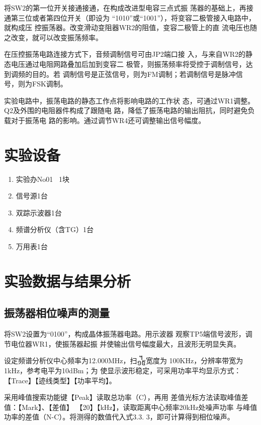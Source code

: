 \documentclass{../source/Experiment}
\begin{document}
将SW2的第一位开关接通接通，在构成改进型电容三点式振
荡器的基础上，再接通第三位或者第四位开关（即设为
“1010”或“1001”），将变容二极管接入电路中，就构成压
控振荡器。改变滑动变阻器WR2的阻值，变容二极管上的直
流电压也随之改变，就可以改变振荡频率。

在压控振荡电路连接方式下，音频调制信号可由JP2端口接
入，与来自WR2的静态电压通过电阻网路叠加后加到变容二
极管，则振荡频率将受控于调制信号，达到调频的目的。若
调制信号是正弦信号，则为FM调制；若调制信号是脉冲信
号，则为FSK调制。

实验电路中，振荡电路的静态工作点将影响电路的工作状
态，可通过WR1调整。Q2及外围的电阻器件构成了跟随电
路，降低了振荡电路的输出阻抗，同时避免负载对于振荡电
路的影响。通过调节WR4还可调整输出信号幅度。


\section{实验设备}
\begin{enumerate}
    \item 实验办No01 \, 1块
    \item 信号源1台
    \item 双踪示波器1台
    \item 频谱分析仪（含TG）1台
    \item 万用表1台
\end{enumerate}

\section{实验数据与结果分析}
\subsection{振荡器相位噪声的测量}

将SW2设置为“0100”，构成晶体振荡器电路。用示波器
观察TP5端信号波形，调节电位器WR1，使振荡器起振
并使输出信号幅度最大，且波形无明显失真。

设定频谱分析仪中心频率为12.000MHz，扫᧿宽度为
100KHz，分辨率带宽为1kHz，参考电平为10dBm；为
使显示波形稳定，可采用功率平均显示方式：【Trace】【迹线类型】【功率平均】。

采用峰值搜索功能键【Peak】读取总功率（C），再用
差值光标方法读取峰值差值：【Mark】、【差值】
【20】【kHz】，读取距离中心频率20kHz处噪声功率
与峰值功率的差值（N-C）。将测得的数值代入式3.3.
3，即可计算得到相位噪声。
\end{document}
